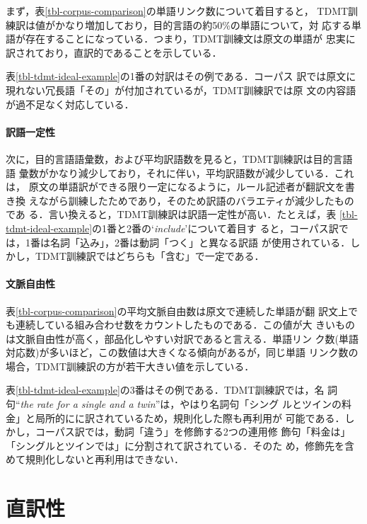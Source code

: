 まず，表\ref{tbl-corpus-comparison}の単語リンク数について着目すると，
TDMT訓練訳は値がかなり増加しており，目的言語の約50\%の単語について，対
応する単語が存在することになっている．つまり，TDMT訓練文は原文の単語が
忠実に訳されており，直訳的であることを示している．

表\ref{tbl-tdmt-ideal-example}の1番の対訳はその例である．コーパス
訳では原文に現れない冗長語「その」が付加されているが，TDMT訓練訳では原
文の内容語が過不足なく対応している．

\paragraph{訳語一定性}

次に，目的言語語彙数，および平均訳語数を見ると，TDMT訓練訳は目的言語語
彙数がかなり減少しており，それに伴い，平均訳語数が減少している．これは，
原文の単語訳ができる限り一定になるように，ルール記述者が翻訳文を書き換
えながら訓練したためであり，そのため訳語のバラエティが減少したものであ
る．言い換えると，TDMT訓練訳は訳語一定性が高い．たとえば，表
\ref{tbl-tdmt-ideal-example}の1番と2番の`{\it include}'について着目す
ると，コーパス訳では，1番は名詞「込み」，2番は動詞「つく」と異なる訳語
が使用されている．しかし，TDMT訓練訳ではどちらも「含む」で一定である．

\paragraph{文脈自由性}

表\ref{tbl-corpus-comparison}の平均文脈自由数は原文で連続した単語が翻
訳文上でも連続している組み合わせ数をカウントしたものである．この値が大
きいものは文脈自由性が高く，部品化しやすい対訳であると言える．単語リン
ク数(単語対応数)が多いほど，この数値は大きくなる傾向があるが，同じ単語
リンク数の場合，TDMT訓練訳の方が若干大きい値を示している．

表\ref{tbl-tdmt-ideal-example}の3番はその例である．TDMT訓練訳では，名
詞句``{\it the rate for a single and a twin}''は，やはり名詞句「シング
ルとツインの料金」と局所的にに訳されているため，規則化した際も再利用が
可能である．しかし，コーパス訳では，動詞「違う」を修飾する2つの連用修
飾句「料金は」「シングルとツインでは」に分割されて訳されている．そのた
め，修飾先を含めて規則化しないと再利用はできない．


\section{直訳性}
\label{sec-translation-literalness}

